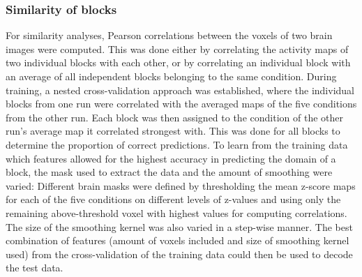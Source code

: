 \documentclass[fleqn,10pt]{SelfArx} %
\begin{document}
\subsubsection*{Similarity of blocks}
For similarity analyses, Pearson correlations between the voxels of two brain images were computed. This was done either by correlating the activity maps of two individual blocks with each other, or by correlating an individual block with an average of all independent blocks belonging to the same condition.
During training, a nested cross-validation approach was established, where the individual blocks from one run were correlated with the averaged maps of the five conditions from the other run. Each block was then assigned to the condition of the other run's average map it correlated strongest with. This was done for all blocks to determine the proportion of correct predictions.
To learn from the training data which features allowed for the highest accuracy in predicting the domain of a block, the mask used to extract the data and the amount of smoothing were varied: Different brain masks were defined by thresholding the mean z-score maps for each of the five conditions on different levels of z-values and using only the remaining above-threshold voxel with highest values for computing correlations. The size of the smoothing kernel was also varied in a step-wise manner. The best combination of features (amount of voxels included and size of smoothing kernel used) from the cross-validation of the training data could then be used to decode the test data.
\end{document}
